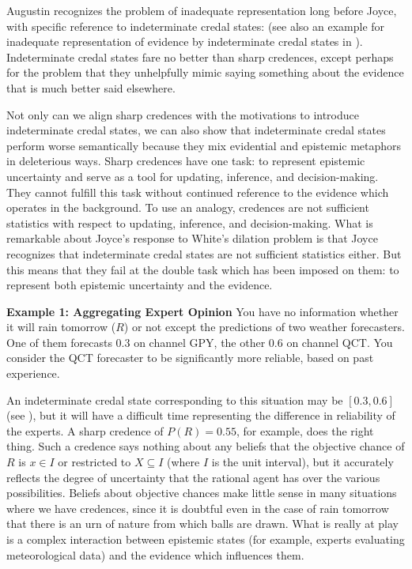 Augustin recognizes the problem of inadequate
representation long before Joyce, with specific
reference to indeterminate credal states: 
 (see also an example for
inadequate representation of evidence by indeterminate
credal states in ).
Indeterminate credal states fare no better than sharp
credences, except perhaps for the problem that they
unhelpfully mimic saying something about the evidence
that is much better said elsewhere.

Not only can we align sharp credences with the
motivations to introduce indeterminate credal states,
we can also show that indeterminate credal states
perform worse semantically because they mix evidential
and epistemic metaphors in deleterious ways. Sharp
credences have one task: to represent epistemic
uncertainty and serve as a tool for updating,
inference, and decision-making. They cannot fulfill
this task without continued reference to the evidence
which operates in the background. To use an analogy,
credences are not sufficient statistics with respect to
updating, inference, and decision-making. What is
remarkable about Joyce's response to White's dilation
problem is that Joyce recognizes that indeterminate
credal states are not sufficient statistics either. But
this means that they fail at the double task which has
been imposed on them: to represent both epistemic
uncertainty and the evidence.

\begin{quotex}
  \textbf{Example 1: Aggregating Expert Opinion} You
  have no information whether it will rain tomorrow
  ($R$) or not except the predictions of two weather
  forecasters. One of them forecasts 0.3 on channel
  GPY, the other 0.6 on channel QCT. You consider the
  QCT forecaster to be significantly more reliable,
  based on past experience.
\end{quotex}

An indeterminate credal state corresponding to this
situation may be $[0.3,0.6]$ (see
), but it will have a difficult
time representing the difference in reliability of the
experts. A sharp credence of $P(R)=0.55$, for example,
does the right thing. Such a credence says nothing
about any beliefs that the objective chance of $R$ is
$x\in{}I$ or restricted to $X\subseteq{}I$ (where $I$
is the unit interval), but it accurately reflects the
degree of uncertainty that the rational agent has over
the various possibilities. Beliefs about objective
chances make little sense in many situations where we
have credences, since it is doubtful even in the case
of rain tomorrow that there is an urn of nature from
which balls are drawn. What is really at play is a
complex interaction between epistemic states (for
example, experts evaluating meteorological data) and
the evidence which influences them.

